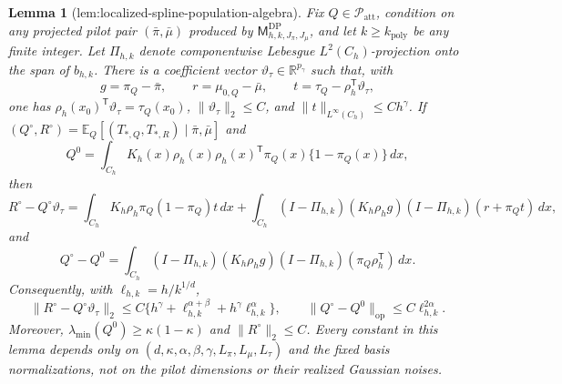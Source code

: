 \documentclass{article}
\newtheorem{lemma}{Lemma}
\begin{document}
\begin{lemma}[lem:localized-spline-population-algebra]\label{lem:localized-spline-population-algebra}
Fix \(Q\in\mathcal P_{\mathrm{att}}\), condition on any projected pilot pair \((\bar\pi,\bar\mu)\) produced by \(\mathsf M_{h,k,J_\pi,J_\mu}^{\mathrm{DP}}\), and let \(k\ge k_{\mathrm{poly}}\) be any finite integer.  Let \(\Pi_{h,k}\) denote componentwise Lebesgue \(L^2(C_h)\)-projection onto the span of \(b_{h,k}\).  There is a coefficient vector \(\vartheta_\tau\in\mathbb R^{p_\gamma}\) such that, with
\[
 g=\pi_Q-\bar\pi,\qquad r=\mu_{0,Q}-\bar\mu,
 \qquad t=\tau_Q-\rho_h^{\mathsf T}\vartheta_\tau,
\]
one has \(\rho_h(x_0)^{\mathsf T}\vartheta_\tau=\tau_Q(x_0)\), \(\lVert\vartheta_\tau\rVert_2\le C\), and \(\lVert t\rVert_{L^\infty(C_h)}\le Ch^\gamma\).  If \((Q^\circ,R^\circ)=\mathbb E_Q[(T_{*,Q},T_{*,R})\mid\bar\pi,\bar\mu]\) and
\[
 Q^0=\int_{C_h}K_h(x)\rho_h(x)\rho_h(x)^{\mathsf T}
       \pi_Q(x)\{1-\pi_Q(x)\}\,dx,
\]
then
\[
 R^\circ-Q^\circ\vartheta_\tau
 =\int_{C_h}K_h\rho_h\pi_Q(1-\pi_Q)t\,dx
 +\int_{C_h}(I-\Pi_{h,k})(K_h\rho_h g)
                 (I-\Pi_{h,k})(r+\pi_Qt)\,dx,
\]
and
\[
 Q^\circ-Q^0
 =\int_{C_h}(I-\Pi_{h,k})(K_h\rho_h g)
                 (I-\Pi_{h,k})(\pi_Q\rho_h^{\mathsf T})\,dx.
\]
Consequently, with \(\ell_{h,k}=h/k^{1/d}\),
\[
 \lVert R^\circ-Q^\circ\vartheta_\tau\rVert_2
 \le C\{h^\gamma+\ell_{h,k}^{\alpha+\beta}
                  +h^\gamma\ell_{h,k}^\alpha\},
 \qquad
 \lVert Q^\circ-Q^0\rVert_{\mathrm{op}}
 \le C\ell_{h,k}^{2\alpha}.
\]
Moreover, \(\lambda_{\min}(Q^0)\ge\kappa(1-\kappa)\) and \(\lVert R^\circ\rVert_2\le C\).  Every constant in this lemma depends only on \((d,\kappa,\alpha,\beta,\gamma,L_\pi,L_\mu,L_\tau)\) and the fixed basis normalizations, not on the pilot dimensions or their realized Gaussian noises.
\end{lemma}
\end{document}
